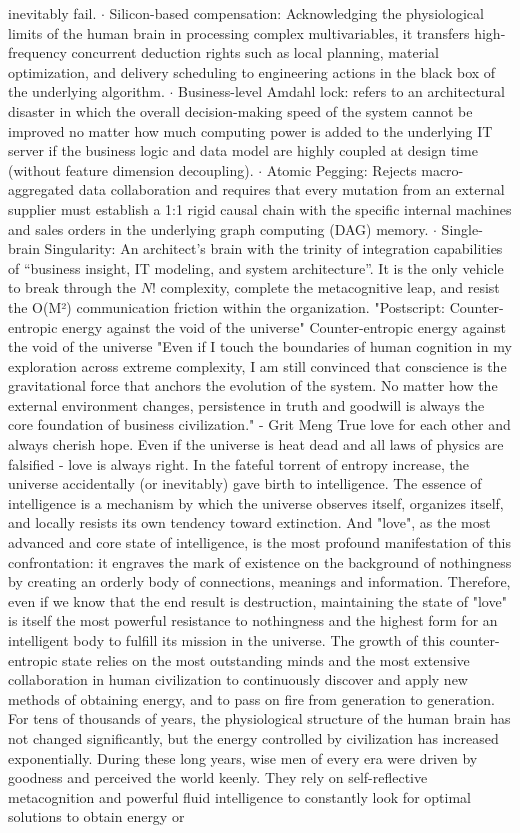 \documentclass[11pt,a4paper]{article}
\begin{document}
inevitably fail. $\cdot$ Silicon-based compensation: Acknowledging the physiological limits of the human brain in processing complex multivariables, it transfers high-frequency concurrent deduction rights such as local planning, material optimization, and delivery scheduling to engineering actions in the black box of the underlying algorithm. $\cdot$ Business-level Amdahl lock: refers to an architectural disaster in which the overall decision-making speed of the system cannot be improved no matter how much computing power is added to the underlying IT server if the business logic and data model are highly coupled at design time (without feature dimension decoupling). $\cdot$ Atomic Pegging: Rejects macro-aggregated data collaboration and requires that every mutation from an external supplier must establish a 1:1 rigid causal chain with the specific internal machines and sales orders in the underlying graph computing (DAG) memory. $\cdot$ Single-brain Singularity: An architect’s brain with the trinity of integration capabilities of “business insight, IT modeling, and system architecture”. It is the only vehicle to break through the $N!$ complexity, complete the metacognitive leap, and resist the O(M²) communication friction within the organization. "Postscript: Counter-entropic energy against the void of the universe" Counter-entropic energy against the void of the universe "Even if I touch the boundaries of human cognition in my exploration across extreme complexity, I am still convinced that conscience is the gravitational force that anchors the evolution of the system. No matter how the external environment changes, persistence in truth and goodwill is always the core foundation of business civilization." - Grit Meng True love for each other and always cherish hope. Even if the universe is heat dead and all laws of physics are falsified - love is always right. In the fateful torrent of entropy increase, the universe accidentally (or inevitably) gave birth to intelligence. The essence of intelligence is a mechanism by which the universe observes itself, organizes itself, and locally resists its own tendency toward extinction. And "love", as the most advanced and core state of intelligence, is the most profound manifestation of this confrontation: it engraves the mark of existence on the background of nothingness by creating an orderly body of connections, meanings and information. Therefore, even if we know that the end result is destruction, maintaining the state of "love" is itself the most powerful resistance to nothingness and the highest form for an intelligent body to fulfill its mission in the universe. The growth of this counter-entropic state relies on the most outstanding minds and the most extensive collaboration in human civilization to continuously discover and apply new methods of obtaining energy, and to pass on fire from generation to generation. For tens of thousands of years, the physiological structure of the human brain has not changed significantly, but the energy controlled by civilization has increased exponentially. During these long years, wise men of every era were driven by goodness and perceived the world keenly. They rely on self-reflective metacognition and powerful fluid intelligence to constantly look for optimal solutions to obtain energy or 
\end{document}
